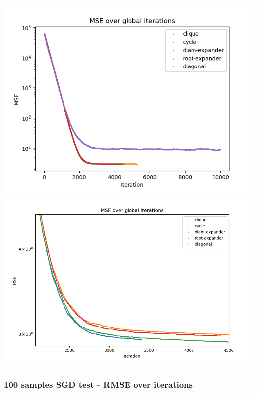 \documentclass[11pt]{article}
\makeatletter
\def\maxwidth{\ifdim\Gin@nat@width>\linewidth\linewidth
    \else\Gin@nat@width\fi}
\let\Oldincludegraphics\includegraphics
\renewcommand{\includegraphics}[1]{\Oldincludegraphics[width=.8\maxwidth]{#1}}
\makeatother
\begin{document}
\includegraphics{media/img/tests/test_003_100samples_stochastic/2_mse_iter.png}
\includegraphics{media/img/tests/test_003_100samples_stochastic/2_mse_iter_zoom.png}

\subsubsection{100 samples SGD test - RMSE over
iterations}\label{samples-sgd-test---rmse-over-iterations}
\end{document}
